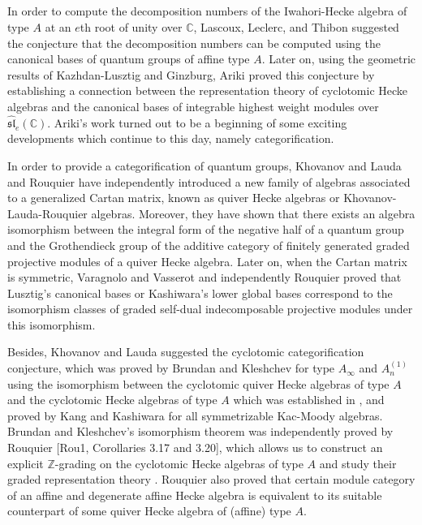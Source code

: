 \documentclass[11pt, reqno]{amsart} \textwidth=14.9cm \oddsidemargin=1cm \evensidemargin=1cm
\theoremstyle{definition}
\numberwithin{equation}{section}
\begin{document}
\subsection{}
In order to compute the decomposition numbers of the Iwahori-Hecke algebra of type $A$ at an $e$th root of unity over $\mathbb{C}$, Lascoux, Leclerc, and Thibon \cite{LLT} suggested the conjecture that the decomposition numbers can be computed using the canonical bases of quantum groups of affine type $A.$ Later on, using the geometric results of Kazhdan-Lusztig and Ginzburg, Ariki \cite{Ari} proved this conjecture by establishing a connection between the representation theory of cyclotomic Hecke algebras and the canonical bases of integrable highest weight modules over $\widehat{\mathfrak{sl}}_{e}(\mathbb{C}).$ Ariki's work turned out to be a beginning of some exciting developments which continue to this day, namely categorification.

In order to provide a categorification of quantum groups, Khovanov and Lauda \cite{KhLa1, KhLa2} and Rouquier \cite{Rou1} have independently introduced a new family of algebras associated to a generalized Cartan matrix, known as quiver Hecke algebras or Khovanov-Lauda-Rouquier algebras. Moreover, they have shown that there exists an algebra isomorphism between the integral form of the negative half of a quantum group and the Grothendieck group of the additive category of finitely generated graded projective modules of a quiver Hecke algebra. Later on, when the Cartan matrix is symmetric, Varagnolo and Vasserot \cite{VV} and independently Rouquier \cite{Rou2} proved that Lusztig's canonical bases or Kashiwara's lower global bases correspond to the isomorphism classes of graded self-dual indecomposable projective modules under this isomorphism.

Besides, Khovanov and Lauda \cite{KhLa1} suggested the cyclotomic categorification conjecture, which was proved by Brundan and Kleshchev \cite{BK2} for type $A_{\infty}$ and $A_{n}^{(1)}$ using the isomorphism between the cyclotomic quiver Hecke algebras of type $A$ and the cyclotomic Hecke algebras of type $A$ which was established in \cite{BK1}, and proved by Kang and Kashiwara \cite{KK} for all symmetrizable Kac-Moody algebras. Brundan and Kleshchev's isomorphism theorem was independently proved by Rouquier [Rou1, Corollaries 3.17 and 3.20], which allows us to construct an explicit $\mathbb{Z}$-grading on the cyclotomic Hecke algebras of type $A$ and study their graded representation theory \cite{BK2}. Rouquier \cite{Rou1} also proved that certain module category of an affine and degenerate affine Hecke algebra is equivalent to its suitable counterpart of some quiver Hecke algebra of (affine) type $A$.
\end{document}
